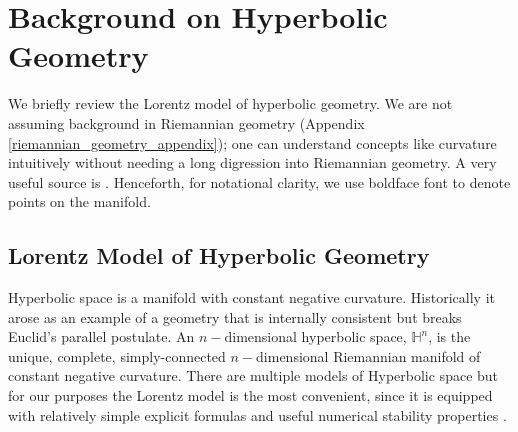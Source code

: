 \section{Background on Hyperbolic Geometry}
We briefly review the Lorentz model of hyperbolic geometry. We are not
assuming background in Riemannian geometry (Appendix \ref{riemannian_geometry_appendix}); one can understand concepts
like curvature intuitively without needing a long digression into
Riemannian geometry. A very useful source is \cite{Ratcliffe94}. Henceforth, for notational clarity, we use boldface font to denote points on the manifold.
\subsection{Lorentz Model of Hyperbolic Geometry}
Hyperbolic space is a manifold with constant negative curvature.  Historically it arose as an example of a geometry that is internally consistent but breaks Euclid's parallel postulate.  An $n-$dimensional hyperbolic space, $\mathbb{H}^n$, is the unique, complete, simply-connected $n-$dimensional Riemannian manifold of constant negative curvature.  There are multiple models of Hyperbolic space but for our purposes the Lorentz model is the most convenient, since it is equipped with relatively simple explicit formulas and useful numerical stability properties \cite{nickel2018learning}.

